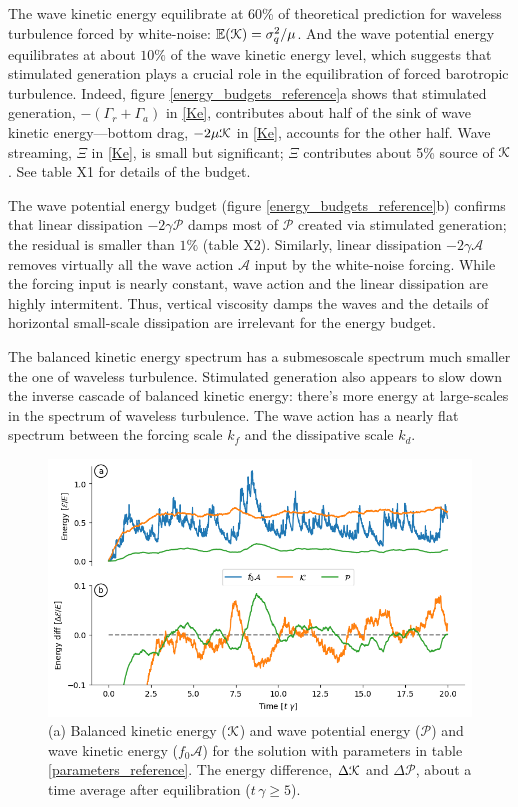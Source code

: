 \documentclass[12pt]{article}
\renewcommand{\P}{\mathcal{P}}
\newcommand{\A}{  \mathcal{A}}
\newcommand{\Es}{\mathbb{E}}
\begin{document}
The wave kinetic energy equilibrate at 60\% of theoretical prediction for waveless
turbulence forced by white-noise: $\Es(\K) = \sigma_q^2/\mu$. And the wave potential
energy equilibrates at about $10\%$ of the wave kinetic energy level, which suggests
that stimulated generation plays a crucial role in the equilibration of forced
barotropic turbulence.  Indeed, figure \ref{energy_budgets_reference}a shows that
stimulated generation, $-(\Gamma_r+\Gamma_a)$ in \eqref{Ke}, contributes about half
of the sink of wave kinetic energy---bottom drag,
$-2\mu \mathcal{K}$ in  \eqref{Ke}, accounts for the other half. Wave streaming, $\Xi$ in
\eqref{Ke}, is small but significant; $\Xi$ contributes about 5\% source of $\mathcal{K}$.
See table X1 for details of the budget.

The wave potential energy budget (figure \ref{energy_budgets_reference}b) confirms that
linear dissipation $-2\gamma \P$ damps most of $\P$ created via stimulated generation;
the residual is smaller than $1\%$ (table X2). Similarly, linear dissipation
$-2\gamma \A$ removes virtually all the wave action
$\A$ input by the white-noise forcing. While the forcing input is nearly constant,
wave action and the linear dissipation are highly intermitent. Thus, vertical viscosity damps the waves
and the details of horizontal small-scale dissipation are irrelevant for the energy budget.

The balanced kinetic energy spectrum has a submesoscale spectrum much smaller the
one of waveless turbulence. Stimulated generation also appears to slow down the
inverse cascade of balanced kinetic energy: there's more energy at large-scales
in the spectrum of waveless turbulence. The wave action has a nearly flat spectrum
between the forcing scale $k_f$ and the dissipative scale $k_d$.

\begin{figure}
\centering
\includegraphics[width=.825\textwidth]{figs/energies_reference.png}
\caption{(a) Balanced kinetic energy ($\mathcal{K}$) and wave potential energy ($\P$) and wave
         kinetic energy ($f_0 \A$)  for the solution with parameters in table
         \ref{parameters_reference}. The energy difference, $\Delta \mathcal{K}$ and $\Delta \P$,
         about a time average after equilibration ($t\,\gamma \ge 5$).}
        \label{energies_reference}
\end{figure}
\end{document}
